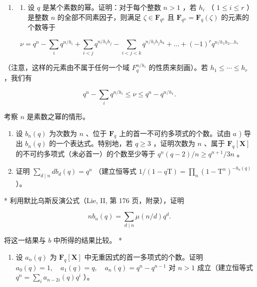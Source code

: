 \BourbakiExerciseGroup

\begin{enumerate}
\def\labelenumi{\arabic{enumi})}
\tightlist
\item
  \begin{enumerate}
  \def\labelenumii{\alph{enumii})}
  \tightlist
  \item
    设 \(q\) 是某个素数的幂。证明：对于每个整数 \(n > 1\) ，若 \(h_i\) （ \(1 \leqslant i \leqslant r\) ）是整数 \(n\) 的全部不同素因子，则满足 \(\zeta \in \mathbf{F}_{q^n}\) 且 \(\mathbf{F}_{q^n} = \mathbf{F}_q(\zeta)\) 的元素的个数等于
  \end{enumerate}
\end{enumerate}

\[
\nu = q ^ {n} - \sum_ {i} q ^ {n / h _ {i}} + \sum_ {i <   j} q ^ {n / h _ {i} h _ {j}} - \sum_ {i <   j <   k} q ^ {n / h _ {i} h _ {j} h _ {k}} + \dots + (- 1) ^ {r} q ^ {n / h _ {1} h _ {2} \dots h _ {r}}
\]

（注意，这样的元素由不属于任何一个域 \(F_{q}^{n/h_{i}}\) 的性质来刻画）。若 \(h_{1} \leqslant \cdots \leqslant h_{r}\) ，我们有

\[
q ^ {n} - \sum_ {i} q ^ {n / h _ {i}} \leqslant \nu \leqslant q ^ {n} - q ^ {n / h _ {1}}.
\]

考察 \(n\) 是素数之幂的情形。

\begin{enumerate}
\def\labelenumi{\alph{enumi})}
\setcounter{enumi}{1}
\item
  设 \(b_{n}(q)\) 为次数为 \(n\) 、位于 \(\mathbf{F}_q\) 上的首一不可约多项式的个数。试由 \(a\) ) 导出 \(b_{n}(q)\) 的一个表达式。特别地，若 \(q \geqslant 3\) ，证明次数为 \(n\) 、属于 \(\mathbf{F}_q[\mathbf{X}]\) 的不可约多项式（未必首一）的个数至少等于 \(q^n (q - 2) / n \geqslant q^{n + 1} / 3n\) 。
\item
  证明 \(\sum_{d\mid n}db_d(q) = q^n\) （建立恒等式 \(1 / (1 - q\mathrm{T}) = \prod_{n}(1 - \mathrm{T}^n)^{-b_n(q)}\) ）。
\end{enumerate}

* 利用默比乌斯反演公式（Lie, II, 第 176 页，附录），证明

\[
n b _ {n} (q) = \sum_ {d \mid n} \mu (n / d) q ^ {d}.
\]

将这一结果与 \(b\) 中所得的结果比较。 *

\begin{enumerate}
\def\labelenumi{\alph{enumi})}
\setcounter{enumi}{3}
\tightlist
\item
  设 \(a_{n}(q)\) 为 \(\mathbf{F}_q[\mathbf{X}]\) 中无重因式的首一多项式的个数。证明 \(a_0(q) = 1, \quad a_1(q) = q, \quad a_n(q) = q^n - q^{n-1}\) 对 \(n > 1\) 成立（建立恒等式 \(q^n = \sum_i a_{n-2i}(q) q^i\) ）。
\end{enumerate}


